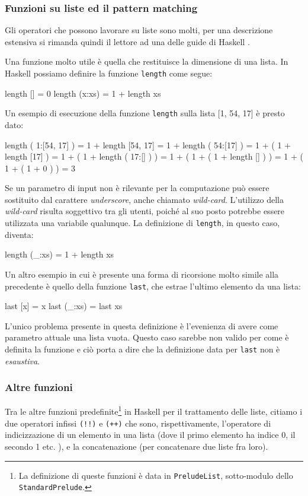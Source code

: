 %
\subsubsection{Funzioni su liste ed il pattern
matching} Gli operatori che possono lavorare
su liste sono molti, per una descrizione estensiva si rimanda quindi il lettore
ad una delle guide di Haskell \cite{PeytonJones03}.

Una funzione molto utile \`e quella che restituisce la dimensione di una 
lista. In Haskell possiamo definire la funzione \verb"length" come segue:
\begin{haskellCode}
length []     = 0
length (x:xs) = 1 + length xs
\end{haskellCode}
Un esempio di esecuzione della funzione \verb"length" sulla lista [1, 
54, 17] \`e presto dato:
\begin{haskellCode}
length ( 1:[54, 17] ) = 1 + length [54, 17]
                      = 1 + length ( 54:[17] )
                      = 1 + ( 1 + length [17] )
                      = 1 + ( 1 + length ( 17:[] ) )
                      = 1 + ( 1 + ( 1 + length [] ) )
                      = 1 + ( 1 + ( 1 + 0 ) )
                      = 3
    
\end{haskellCode}
Se un parametro di input non \`{e} rilevante per la computazione 
pu\`{o} essere sostituito dal carattere \emph{underscore}, anche chiamato \emph{wild-card}.
L'utilizzo della \emph{wild-card} risulta soggettivo tra gli utenti, poich\'e al suo posto potrebbe essere utilizzata
una variabile qualunque.
La definizione di \verb"length", in questo caso, diventa:
\begin{haskellCode}
length (_:xs) = 1 + length xs
\end{haskellCode}

Un altro esempio in cui \`e presente  una forma di ricorsione molto simile 
alla precedente \`e quello della funzione \verb"last", che estrae l'ultimo 
elemento da una lista:
\begin{haskellCode}
last [x]     = x
last (_:xs) = last xs
\end{haskellCode}
L'unico problema presente in questa definizione \`e l'evenienza di avere 
come parametro attuale una lista vuota. Questo caso sarebbe non valido per 
come \`e definita la funzione e ci\`o porta a dire che la definizione 
data per \verb"last" non \`e \emph{esaustiva}. 

%
\subsubsection{Altre funzioni}
Tra le altre funzioni predefinite\footnote{La definizione di queste funzioni \`e data in
\texttt{PreludeList}, sotto-modulo dello \texttt{StandardPrelude}.} in Haskell per il
trattamento delle liste, citiamo i due operatori infissi \verb"(!!)" e \verb"(++)" che sono,
rispettivamente, l'operatore di indicizzazione di un elemento in una lista (dove il primo
elemento ha indice 0, il secondo 1 etc.  ), e la concatenazione (per concatenare due liste fra
loro).

